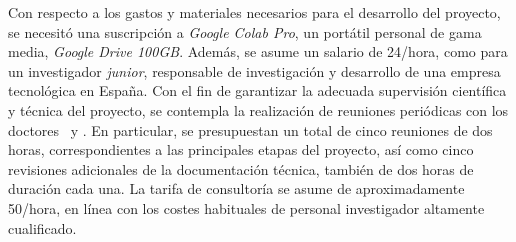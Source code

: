 \begin{table}[ht]
\centering
{}
\caption{Planificación temporal del proyecto.}
\label{tab:PlanificacionFinal}
\end{table}

Con respecto a los gastos y materiales necesarios para el desarrollo del proyecto, se necesitó una
suscripción a \emph{Google Colab Pro}, un portátil personal de gama media, \emph{Google Drive 100GB}.
Además, se asume un salario de 24\officialeuro/hora, como para un investigador \emph{junior},
responsable de investigación y desarrollo de una empresa tecnológica en España.
Con el fin de garantizar la adecuada supervisión científica y técnica del proyecto,
se contempla la realización de reuniones periódicas con los doctores \myProf~y \myOtherProf.
En particular, se presupuestan un total de cinco reuniones de dos horas, correspondientes a las principales
etapas del proyecto, así como cinco revisiones adicionales de la documentación técnica, también de dos horas de duración cada una. La
tarifa de consultoría se asume de aproximadamente 50\officialeuro/hora, en línea con los costes
habituales de personal investigador altamente cualificado.

